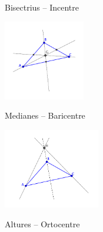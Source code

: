 \begin{theorybox}
\begin{multicols}{2}
		Bisectrius -- Incentre
		
		\includegraphics[height=3.5cm]{img-09/baricentre}
		
		Medianes -- Baricentre
		
		
		\includegraphics[height=3.5cm]{img-09/ortocentre}
		
		Altures -- Ortocentre
		
	\end{multicols}
	
\end{theorybox}
 
